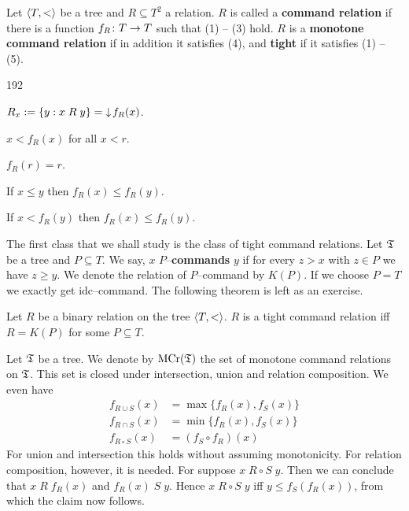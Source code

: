 \begin{defn}
Let $\langle T,<\rangle$ be a tree and $R \subseteq T^2$ a
relation. $R$ is called a \textbf{command relation} 
if there is a function $f_R \colon T \rightarrow T$ such that (1) -- (3) hold. 
$R$ is a \textbf{monotone command relation} 
if in addition it satisfies (4), 
and \textbf{tight} if it satisfies (1) -- (5).
\begin{dingautolist}{192}
\item $R_x := \{y : x\; R\; y\} = {\downarrow\! f_R(x)}$.
\item $x < f_R(x)$ for all $ x < r$.
\item $f_R(r) = r$.
\item If $x \leq y$ then $f_R(x) \leq f_R(y)$.
\item If $x < f_R(y)$ then $f_R(x) \leq f_R(y)$.
\end{dingautolist}
\end{defn}
The first class that we shall study is the class of tight
command relations. Let $\mathfrak{T}$ be a tree and $P \subseteq T$.
We say,  $x$ $P$--\textbf{commands} $y$ if for every $z > x$ with
$z \in P$ we have $z \geq y$.  We denote the relation of
$P$--command by $K(P)$. If we choose $P = T$ we exactly get
idc--command. The following theorem is left as an exercise.
\begin{prop}
\label{prop:dicht}
Let $R$ be a binary relation on the tree $\langle T, <\rangle$.
$R$ is a tight command relation iff $R = K(P)$ for some 
$P \subseteq T$.
\end{prop}
Let $\mathfrak{T}$ be a tree. We denote by $\mbox{\rm MCr}(\mathfrak{T})$ the set of
monotone command relations on $\mathfrak{T}$. This set is closed under
intersection, union and relation composition. We even have
\begin{equation}
\begin{split}
f_{R \cup S}(x) & = \max \{f_R(x), f_S(x)\} \\
f_{R \cap S}(x) & = \min \{f_R(x), f_S(x)\} \\
f_{R \circ S}(x) & = (f_S \circ f_R)(x)
\end{split}
\end{equation}
For union and intersection this holds without assuming monotonicity. 
For relation composition, however, it is needed. For suppose 
$x\; R \circ S\; y$. Then we can conclude that $x\; R\; f_R(x)$
and $f_R(x)\; S\; y$. Hence $x\; R \circ S\; y$ iff
$y \leq f_S(f_R(x))$, from which the claim now follows.
